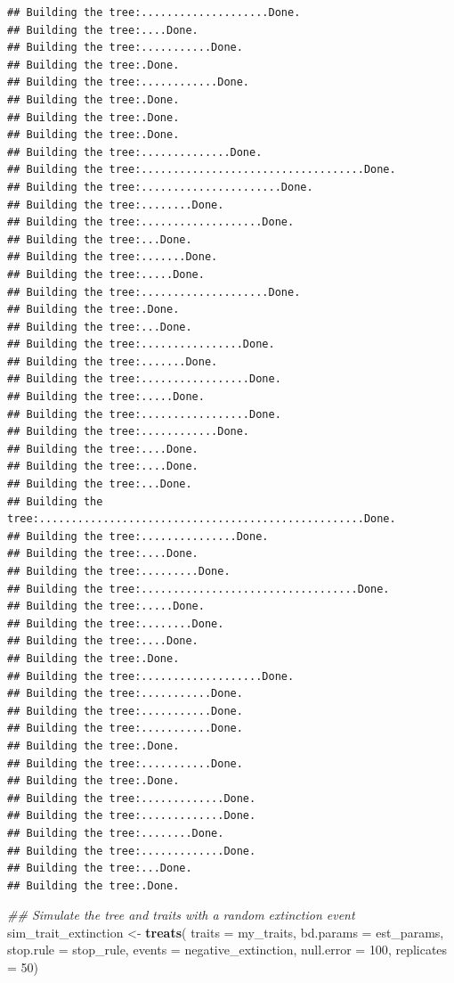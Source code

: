 \documentclass[
]{book}
\newenvironment{Shaded}{\begin{snugshade}}{\end{snugshade}}
\newcommand{\CommentTok}[1]{\textcolor[rgb]{0.56,0.35,0.01}{\textit{#1}}}
\newcommand{\DataTypeTok}[1]{\textcolor[rgb]{0.13,0.29,0.53}{#1}}
\newcommand{\DecValTok}[1]{\textcolor[rgb]{0.00,0.00,0.81}{#1}}
\newcommand{\KeywordTok}[1]{\textcolor[rgb]{0.13,0.29,0.53}{\textbf{#1}}}
\newcommand{\NormalTok}[1]{#1}
\newcommand{\StringTok}[1]{\textcolor[rgb]{0.31,0.60,0.02}{#1}}
\begin{document}
\begin{verbatim}
## Building the tree:....................Done.
## Building the tree:....Done.
## Building the tree:...........Done.
## Building the tree:.Done.
## Building the tree:............Done.
## Building the tree:.Done.
## Building the tree:.Done.
## Building the tree:.Done.
## Building the tree:..............Done.
## Building the tree:...................................Done.
## Building the tree:......................Done.
## Building the tree:........Done.
## Building the tree:...................Done.
## Building the tree:...Done.
## Building the tree:.......Done.
## Building the tree:.....Done.
## Building the tree:....................Done.
## Building the tree:.Done.
## Building the tree:...Done.
## Building the tree:................Done.
## Building the tree:.......Done.
## Building the tree:.................Done.
## Building the tree:.....Done.
## Building the tree:.................Done.
## Building the tree:............Done.
## Building the tree:....Done.
## Building the tree:....Done.
## Building the tree:...Done.
## Building the tree:...................................................Done.
## Building the tree:...............Done.
## Building the tree:....Done.
## Building the tree:.........Done.
## Building the tree:..................................Done.
## Building the tree:.....Done.
## Building the tree:........Done.
## Building the tree:....Done.
## Building the tree:.Done.
## Building the tree:...................Done.
## Building the tree:...........Done.
## Building the tree:...........Done.
## Building the tree:...........Done.
## Building the tree:.Done.
## Building the tree:...........Done.
## Building the tree:.Done.
## Building the tree:.............Done.
## Building the tree:.............Done.
## Building the tree:........Done.
## Building the tree:.............Done.
## Building the tree:...Done.
## Building the tree:.Done.
\end{verbatim}

\begin{Shaded}
\begin{Highlighting}[]
\CommentTok{\#\# Simulate the tree and traits with a random extinction event}
\NormalTok{sim\_trait\_extinction \textless{}{-}}\StringTok{ }\KeywordTok{treats}\NormalTok{(}
                   \DataTypeTok{traits     =}\NormalTok{ my\_traits,}
                   \DataTypeTok{bd.params  =}\NormalTok{ est\_params,}
                   \DataTypeTok{stop.rule  =}\NormalTok{ stop\_rule,}
                   \DataTypeTok{events     =}\NormalTok{ negative\_extinction,}
                   \DataTypeTok{null.error =} \DecValTok{100}\NormalTok{,}
                   \DataTypeTok{replicates =} \DecValTok{50}\NormalTok{)}
\end{Highlighting}
\end{Shaded}
\end{document}
